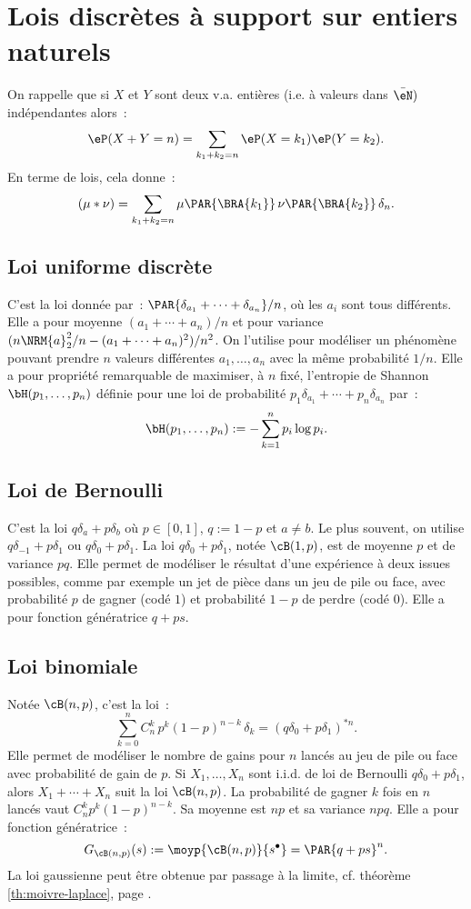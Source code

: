 %
\section{Lois discrètes à support sur entiers naturels}
%

On rappelle que si $X$ et $Y$ sont deux v.a. entières (i.e. à valeurs dans
$\bar{\eN})$ indépendantes alors~:
$$
\eP(X+Y=n)=\sum_{k_1+k_2=n}\eP(X=k_1)\eP(Y=k_2).
$$
En terme de lois, cela donne~:
$$
(\mu*\nu)=\sum_{k_1+k_2=n}\mu\PAR{\BRA{k_1}}\,\nu\PAR{\BRA{k_2}}\,\delta_n.
$$

%
\subsection{Loi uniforme discrète}\label{ss:loi:uniforme-discrete}
%

C'est la loi donnée par~: $\PAR{\delta_{a_1}+\cdots+\delta_{a_n}}/n$, où les $a_i$ sont
tous différents. Elle a pour moyenne $(a_1+\cdots+a_n)/n$ et pour variance
$(n\NRM{a}_2^2/n-(a_1+\cdots+a_n)^2)/n^2$. On l'utilise pour modéliser un phénomène
pouvant prendre $n$ valeurs différentes $a_1,\ldots,a_n$ avec la même probabilité
$1/n$. Elle a pour propriété remarquable de maximiser, à $n$ fixé, l'entropie
de Shannon $\bH(p_1,\ldots,p_n)$ définie pour une loi de probabilité
$p_1\delta_{a_1}+\cdots+p_n\delta_{a_n}$ par~:
$$
\bH(p_1,\ldots,p_n):=-\sum_{k=1}^n p_i\log p_i.
$$

%
\subsection{Loi de Bernoulli}\label{ss:loi:bernoulli}
%

C'est la loi $q\delta_a+p\delta_b$ où $p\in[0,1]$, $q:=1-p$ et $a\neq b$. Le plus
souvent, on utilise $q\delta_{-1}+p\delta_1$ ou $q\delta_0+p\delta_1$.  La loi
$q\delta_0+p\delta_1$, notée $\cB(1,p)$, est de moyenne $p$ et de variance $pq$.
Elle permet de modéliser le résultat d'une expérience à deux issues possibles,
comme par exemple un jet de pièce dans un jeu de pile ou face, avec
probabilité $p$ de gagner (codé $1$) et probabilité $1-p$ de perdre (codé
$0$). Elle a pour fonction génératrice $q+ps$.

%
\subsection{Loi binomiale}\label{ss:loi:binomiale}
%

Notée $\cB(n,p)$, c'est la loi~:
$$
\sum_{k=0}^n C_n^k\,p^k(1-p)^{n-k}\,\delta_k=(q\delta_0+p\delta_1)^{*n}.
$$
Elle permet de modéliser le nombre de gains pour $n$ lancés au jeu de pile
ou face avec probabilité de gain de $p$. Si $X_1,\ldots,X_n$ sont i.i.d. de loi de
Bernoulli $q\delta_0+p\delta_1$, alors $X_1+\cdots+X_n$ suit la loi $\cB(n,p)$. La
probabilité de gagner $k$ fois en $n$ lancés vaut $C_n^k p^k(1-p)^{n-k}$. Sa
moyenne est $np$ et sa variance $npq$. Elle a pour fonction génératrice~:
$$
G_{\cB(n,p)}(s):=\moyp{\cB(n,p)}{s^\bullet}=\PAR{q+ps}^n.
$$
La loi gaussienne peut être obtenue par passage à la limite, cf. théorème
\ref{th:moivre-laplace}, page \pageref{th:moivre-laplace}.

